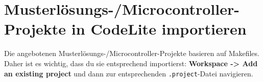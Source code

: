 \section*{Musterlösungs-/Microcontroller-Projekte in CodeLite importieren}

Die angebotenen Musterlösungs-/Microcontroller-Projekte basieren auf Makefiles.
Daher ist es wichtig, dass du sie entsprechend importierst: \textbf{Workspace -> Add an existing project} und dann zur entsprechenden \texttt{.project}-Datei navigieren.